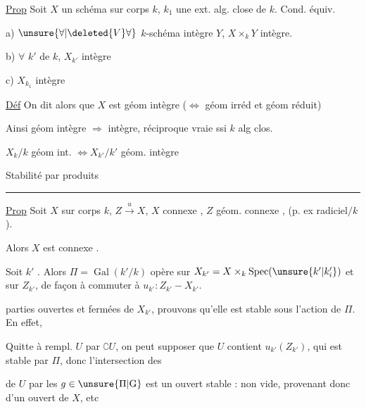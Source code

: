 \uline{Prop} Soit $X$ un schéma sur corps $k$, $k_1$ une ext. alg. close de $k$. Cond. équiv.

a) $\unsure{\forall|\deleted{V}\forall}$ $k$-schéma intègre $Y$, $X\times_k Y$ intègre.

b) $\forall$  $k'$ de $k$, $X_{k'}$ intègre

c)  $X_{k_1}$ intègre

\uline{Déf} On dit alors que $X$ est géom intègre ($\Longleftrightarrow$ géom irréd et géom réduit)

Ainsi géom intègre $\Rightarrow$ intègre, réciproque vraie ssi $k$ alg clos.

$X_k/k$ géom int. $\Longleftrightarrow X_{k'}/k'$ géom. intègre

Stabilité par produits

\par\noindent\rule{.22\linewidth}{.4pt}\par
\uline{Prop} Soit $X$ sur corps $k$, $Z\xrightarrow{u}X$, $X$ connexe , $Z$ géom. connexe , (p. ex  radiciel$/k$).

\noindent\vrule\enspace Alors $X$ est  connexe .

Soit $k'$  . Alors $\Pi=\operatorname{Gal}(k'/k)$ opère sur $X_{k'}=X\times_k\operatorname{Spec}(\unsure{k'|k'_i})$ et sur $Z_{k'}$, de façon à commuter à $u_{k'}: Z_{k'} - X_{k'}$.

  parties ouvertes et fermées de $X_{k'}$,     prouvons qu'elle est stable sous l'action de $\Pi$. En effet,

 Quitte à rempl. $U$ par $\complement U$, on peut supposer que $U$ contient $u_{k'}(Z_{k'})$, qui est stable par $\Pi$, donc l'intersection  des

  de $U$ par les $g\in \unsure{\Pi|\mathrm{G}}$ est un ouvert stable  :  non vide, provenant donc d'un ouvert  de $X$, etc

